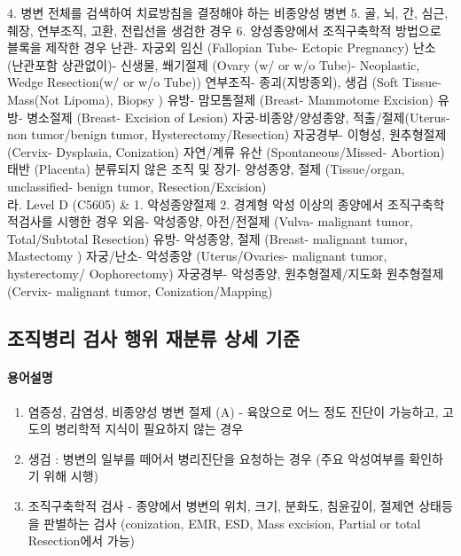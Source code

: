 \begin{tabu}
	4. 병변 전체를 검색하여 치료방침을 결정해야 하는 비종양성 병변
	5. 골, 뇌, 간, 심근, 췌장, 연부조직, 고환, 전립선을 생검한 경우
	6. 양성종양에서 조직구축학적 방법으로 블록을 제작한 경우 \newline
	난관- 자궁외 임신 (Fallopian Tube- Ectopic Pregnancy)\newline
	난소 (난관포함 상관없이)- 신생물, 쐐기절제 (Ovary (w/ or w/o Tube)- Neoplastic, Wedge Resection(w/ or w/o Tube))\newline
	연부조직- 종괴(지방종외), 생검 (Soft Tissue- Mass(Not Lipoma), Biopsy )\newline
	유방- 맘모톰절제 (Breast- Mammotome Excision)\newline
	유방- 병소절제 (Breast- Excision of Lesion)\newline
	자궁-비종양/양성종양, 적출/절제(Uterus- non tumor/benign tumor, Hysterectomy/Resection)\newline
	자궁경부- 이형성, 원추형절제 (Cervix- Dysplasia, Conization)\newline
	자연/계류 유산 (Spontaneous/Missed- Abortion)\newline
	태반 (Placenta)\newline
	분류되지 않은 조직 및 장기- 양성종양, 절제 (Tissue/organ, unclassified- benign tumor, Resection/Excision)\\ \tabucline[.5pt]{-}
 라. Level D (C5605) &	1. 악성종양절제
	2. 경계형 악성 이상의 종양에서 조직구축학적검사를 시행한 경우 \newline
	외음- 악성종양, 아전/전절제 (Vulva- malignant tumor, Total/Subtotal Resection) \newline
	유방- 악성종양, 절제 (Breast- malignant tumor, Mastectomy )\newline
	자궁/난소- 악성종양 (Uterus/Ovaries- malignant tumor, hysterectomy/ Oophorectomy)\newline
	자궁경부- 악성종양, 원추형절제/지도화 원추형절제 (Cervix- malignant tumor, Conization/Mapping)\\ \tabucline[.5pt]{-}
\end{tabu}

\subsection{조직병리 검사 행위 재분류 상세 기준}
\paragraph{용어설명}
\begin{enumerate}\tightlist
\item 염증성, 감염성, 비종양성 병변 절제 (A) - 육앉으로 어느 정도 진단이 가능하고, 고도의 병리학적 지식이 필요하지 않는 경우
\item 생검 : 병변의 일부를 떼어서 병리진단을 요청하는 경우 (주요 악성여부를 확인하기 위해 시행)
\item 조직구축학적 검사 - 종양에서 병변의 위치, 크기, 분화도, 침윤깊이, 절제연 상태등을 판별하는 검사 (conization, EMR, ESD, Mass excision, Partial or total Resection에서 가능)
\end{enumerate}

